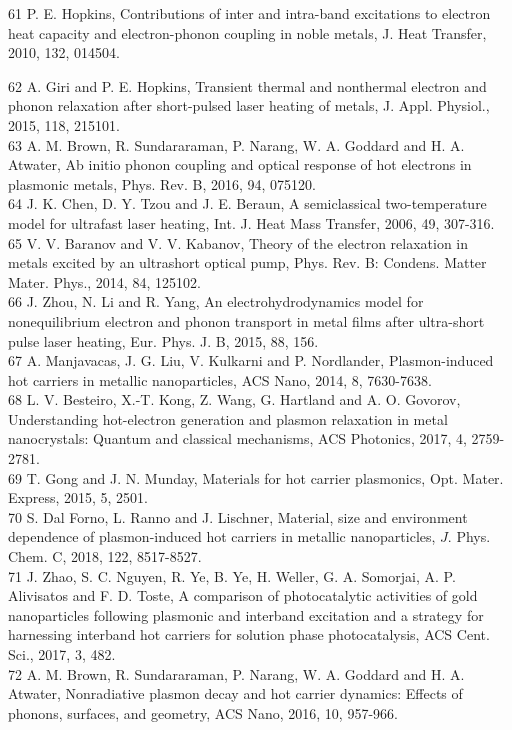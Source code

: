 \documentclass[10pt]{article}
\begin{document}
61 P. E. Hopkins, Contributions of inter and intra-band excitations to electron heat capacity and electron-phonon coupling in noble metals, J. Heat Transfer, 2010, 132, 014504.

62 A. Giri and P. E. Hopkins, Transient thermal and nonthermal electron and phonon relaxation after short-pulsed laser heating of metals, J. Appl. Physiol., 2015, 118, 215101.\\
63 A. M. Brown, R. Sundararaman, P. Narang, W. A. Goddard and H. A. Atwater, Ab initio phonon coupling and optical response of hot electrons in plasmonic metals, Phys. Rev. B, 2016, 94, 075120.\\
64 J. K. Chen, D. Y. Tzou and J. E. Beraun, A semiclassical two-temperature model for ultrafast laser heating, Int. J. Heat Mass Transfer, 2006, 49, 307-316.\\
65 V. V. Baranov and V. V. Kabanov, Theory of the electron relaxation in metals excited by an ultrashort optical pump, Phys. Rev. B: Condens. Matter Mater. Phys., 2014, 84, 125102.\\
66 J. Zhou, N. Li and R. Yang, An electrohydrodynamics model for nonequilibrium electron and phonon transport in metal films after ultra-short pulse laser heating, Eur. Phys. J. B, 2015, 88, 156.\\
67 A. Manjavacas, J. G. Liu, V. Kulkarni and P. Nordlander, Plasmon-induced hot carriers in metallic nanoparticles, ACS Nano, 2014, 8, 7630-7638.\\
68 L. V. Besteiro, X.-T. Kong, Z. Wang, G. Hartland and A. O. Govorov, Understanding hot-electron generation and plasmon relaxation in metal nanocrystals: Quantum and classical mechanisms, ACS Photonics, 2017, 4, 2759-2781.\\
69 T. Gong and J. N. Munday, Materials for hot carrier plasmonics, Opt. Mater. Express, 2015, 5, 2501.\\
70 S. Dal Forno, L. Ranno and J. Lischner, Material, size and environment dependence of plasmon-induced hot carriers in metallic nanoparticles, $J$. Phys. Chem. C, 2018, 122, 8517-8527.\\
71 J. Zhao, S. C. Nguyen, R. Ye, B. Ye, H. Weller, G. A. Somorjai, A. P. Alivisatos and F. D. Toste, A comparison of photocatalytic activities of gold nanoparticles following plasmonic and interband excitation and a strategy for harnessing interband hot carriers for solution phase photocatalysis, ACS Cent. Sci., 2017, 3, 482.\\
72 A. M. Brown, R. Sundararaman, P. Narang, W. A. Goddard and H. A. Atwater, Nonradiative plasmon decay and hot carrier dynamics: Effects of phonons, surfaces, and geometry, ACS Nano, 2016, 10, 957-966.\\
\end{document}
